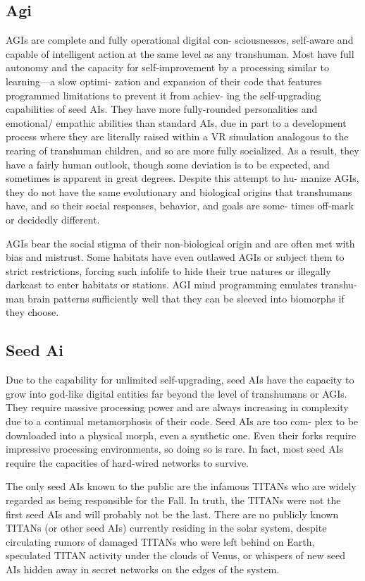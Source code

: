 \subsection{Agi}

AGIs are complete and fully operational digital con-
sciousnesses, self-aware and capable of intelligent 
action at the same level as any transhuman. Most have 
full autonomy and the capacity for self-improvement 
by a processing similar to learning—a slow optimi-
zation and expansion of their code that features 
programmed limitations to prevent it from achiev-
ing the self-upgrading capabilities of seed AIs. They 
have more fully-rounded personalities and emotional/
empathic abilities than standard AIs, due in part to 
a development process where they are literally raised 
within a VR simulation analogous to the rearing of 
transhuman children, and so are more fully socialized. 
As a result, they have a fairly human outlook, though 
some deviation is to be expected, and sometimes is 
apparent in great degrees. Despite this attempt to hu-
manize AGIs, they do not have the same evolutionary 
and biological origins that transhumans have, and so 
their social responses, behavior, and goals are some-
times off-mark or decidedly different.

AGIs bear the social stigma of their non-biological 
origin and are often met with bias and mistrust. Some 
habitats have even outlawed AGIs or subject them to 
strict restrictions, forcing such infolife to hide their 
true natures or illegally darkcast to enter habitats or 
stations. AGI mind programming emulates transhu-
man brain patterns sufficiently well that they can be 
sleeved into biomorphs if they choose.

\subsection{Seed Ai}

Due to the capability for unlimited self-upgrading, 
seed AIs have the capacity to grow into god-like 
digital entities far beyond the level of transhumans 
or AGIs. They require massive processing power and 
are always increasing in complexity due to a continual 
metamorphosis of their code. Seed AIs are too com-
plex to be downloaded into a physical morph, even 
a synthetic one. Even their forks require impressive 
processing environments, so doing so is rare. In fact, 
most seed AIs require the capacities of hard-wired 
networks to survive.

The only seed AIs known to the public are the 
infamous TITANs who are widely regarded as being 
responsible for the Fall. In truth, the TITANs were 
not the first seed AIs and will probably not be the last. 
There are no publicly known TITANs (or other seed 
AIs) currently residing in the solar system, despite 
circulating rumors of damaged TITANs who were left 
behind on Earth, speculated TITAN activity under the 
clouds of Venus, or whispers of new seed AIs hidden 
away in secret networks on the edges of the system.

